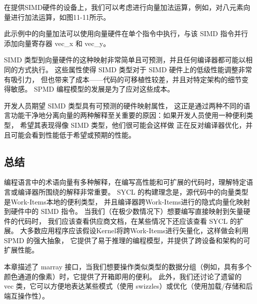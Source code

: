 在提供SIMD硬件的设备上，我们可以考虑进行向量加法运算，例如，对八元素向量进行加法运算，如图11-11所示。

此示例中的向量加法可以使用向量硬件在单个指令中执行，与该 SIMD 指令并行添加向量寄存器 vec\_x 和 vec\_y。

SIMD 类型到向量硬件的这种映射非常简单且可预测，并且任何编译器都可能以相同的方式执行。 
这些属性使得 SIMD 类型对于 SIMD 硬件上的低级性能调整非常有吸引力，
但也带来了成本——代码的可移植性较差，并且对特定架构的细节变得敏感。 SPMD 编程模型的发展是为了应对这些成本。

开发人员期望 SIMD 类型具有可预测的硬件映射属性，
这正是通过两种不同的语言功能干净地分离向量的两种解释至关重要的原因：如果开发人员使用一种便利类型，
希望其表现得像 SIMD 类型，他们很可能会这样做 正在反对编译器优化，并且可能会看到性能低于希望或预期的性能。

\subsection{总结}
编程语言中的术语向量有多种解释，在编写高性能和可扩展的代码时，理解特定语言或编译器所围绕的解释非常重要。 
SYCL 的构建理念是，源代码中的向量类型是Work-Items本地的便利类型，
并且编译器跨Work-Items进行的隐式向量化映射到硬件中的 SIMD 指令。 
当我们（在极少数情况下）想要编写直接映射到矢量硬件的代码时，
我们应该查看供应商文档，在某些情况下还应该查看 SYCL 的扩展。 
大多数应用程序应该假设Kernel将跨Work-Items进行矢量化，这样做会利用 SPMD 的强大抽象，
它提供了易于推理的编程模型，并提供了跨设备和架构的可扩展性能。

本章描述了 marray 接口，当我们想要操作类似类型的数据分组（例如，具有多个颜色通道的像素）时，它提供了开箱即用的便利。 
此外，我们还讨论了遗留的 vec 类，它可以方便地表达某些模式（使用 swizzles）或优化（使用加载/存储和后端互操作性）。